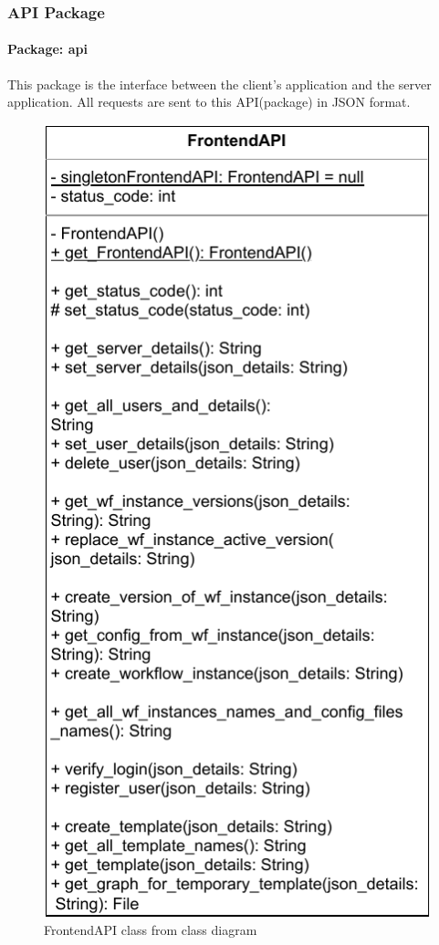 \subsubsection{\label{API} API Package}
\paragraph{Package: api} This package is the interface between the client's application and the server application. 
All requests are sent to this API(package) in JSON format.


\begin{figure}[h]
        \centerline{\includegraphics[scale=1]{res/Klassen/FrontendAPI.pdf}}
        \caption{FrontendAPI class from class diagram}
\end{figure}

